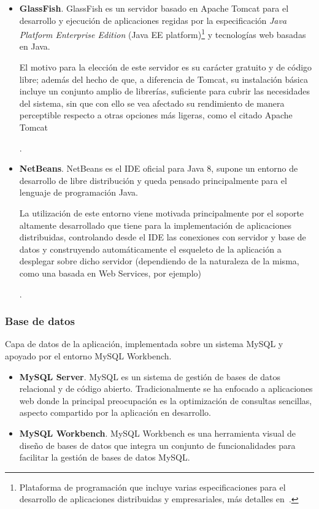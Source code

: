 \begin{itemize}
	\item{\textbf{GlassFish}. GlassFish es un servidor basado en Apache Tomcat para el desarrollo y ejecución de aplicaciones regidas por la especificación \textit{Java Platform Enterprise Edition} (Java EE platform)\footnote{Plataforma de programación que incluye varias especificaciones para el desarrollo de aplicaciones distribuidas y empresariales, más detalles en~\cite{OraEE}.} y tecnologías web basadas en Java.
	
	El motivo para la elección de este servidor es su carácter gratuito y de código libre; además del hecho de que, a diferencia de Tomcat, su instalación básica incluye un conjunto amplio de librerías, suficiente para cubrir las necesidades del sistema, sin que con ello se vea afectado su rendimiento de manera perceptible respecto a otras opciones más ligeras, como el citado Apache Tomcat}.
	
	\item{\textbf{NetBeans}. NetBeans es el IDE oficial para Java 8, supone un entorno de desarrollo de libre distribución y queda pensado principalmente para el lenguaje de programación Java.
		
	La utilización de este entorno viene motivada principalmente por el soporte altamente desarrollado que tiene para la implementación de aplicaciones distribuidas, controlando desde el IDE las conexiones con servidor y base de datos y construyendo automáticamente el esqueleto de la aplicación a desplegar sobre dicho servidor (dependiendo de la naturaleza de la misma, como una basada en Web Services, por ejemplo)}.
\end{itemize}

\subsubsection{Base de datos}

Capa de datos de la aplicación, implementada sobre un sistema MySQL y apoyado por el entorno MySQL Workbench.

\begin{itemize}
	\item \textbf{MySQL Server}. MySQL es un sistema de gestión de bases de datos relacional y de código abierto. Tradicionalmente se ha enfocado a aplicaciones web donde la principal preocupación es la optimización de consultas sencillas, aspecto compartido por la aplicación en desarrollo.	
	
	\item \textbf{MySQL Workbench}. MySQL Workbench es una herramienta visual de diseño de bases de datos que integra un conjunto de funcionalidades para facilitar la gestión de bases de datos MySQL.
\end{itemize}

